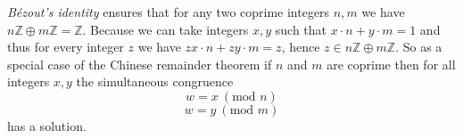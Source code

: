 \documentclass{article}
\renewcommand{\mod}{\text{mod }}
\newcommand{\Int}{\mathbb{Z}}
\begin{document}
  \textit{Bézout's identity} ensures that for any two coprime integers $n,m$ we
  have $n \Int \oplus m \Int = \Int$. Because we can take integers $x,y$ such
  that $x \cdot n + y \cdot m = 1$ and thus for every integer $z$ we have
  $zx \cdot n + zy \cdot m = z$, hence $z \in n \Int \oplus m \Int$. So as a
  special case of the Chinese remainder theorem if $n$ and $m$ are coprime then
  for all integers $x,y$ the simultaneous congruence
  \[ w = x ~(\mod n) \]
  \[ w = y ~(\mod m) \]
  has a solution.
\end{document}
